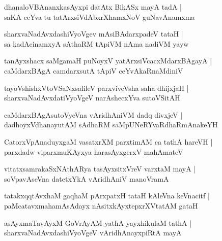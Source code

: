 \documentclass[twoside,12pt,openright]{book}
\newcounter{shloka}[chapter]
\begin{document}
\begin{shloka}%
dhanaloVBAnanxkasAyxpi datAtx BikASx mayA tadA |\\
saKA ceYva tu tatArxsiVdAbxrXhamxNoV guNavAnamxma 
\end{shloka}

\begin{shloka}%
sharxvaNadAvxdashiVyoVgev mAsiBAdarxpadeV tataH |\\
sa kadAcinamxyA sAthaRM tApiVM nAma nadiVM yayw 
\end{shloka}

\begin{shloka}%
tanAyxshacx saMgamaH puNoyxV yatArxsiVcacxMdarxBAgayA |\\
caMdarxBAgA camdarxsutA tApiV ceYvAkaRnaMdiniV 
\end{shloka}

\begin{shloka}%
tayoVshishxVtoVSaNxsalileV parxviveVsha saha dhijxjaH |\\
sharxvaNadAvxdatiVyoVgeV narAshecxYva sutoVSitAH
\end{shloka}

\begin{shloka}%
caMdarxBAgAsutoVyeVna vAridhAniVM dadq divxjeV |\\
dadhoyxVdhanayutAM sAdhaRM saMpUNeRYvaRdhaRmAnakeYH
\end{shloka}

\begin{shloka}%
CatorxVpAnaduyxgaM vasatxrXM parxtimAM ca tathA hareVH |\\
parxdadw viparxmuKAyxya harasAyxgerxV mahAmateV 
\end{shloka}

\begin{shloka}%
vitatxsamrakaSxNAthARya tasAyxsitxVreV varxtaM mayA |\\
soVpavAseVna datetxYkA vAridhAniV manoVramA
\end{shloka}

\begin{shloka}%
tatakxqqtAvxhaM gaqhaM pArxpatxH tataH kAleVna keVnacitf |\\
paMcatavxmahamAsAdayx nAsitxkAyxtepxrXVtatAM gataH 
\end{shloka}

\begin{shloka}%
asAyxmaTavAyxM GoVrAyAM yathA yayxhikulaM tathA |\\
sharxvaNadAvxdashiVyoVgeV vAridhAnayxpiRtA mayA
\end{shloka}
\end{document}
